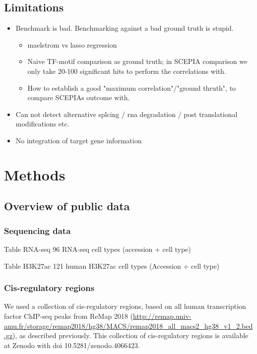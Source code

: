 \subsection{Limitations}
\begin{itemize}
    \item Benchmark is bad. Benchmarking against a bad ground truth is stupid.
    \begin{itemize}
        \item maelstrom vs lasso regression
        \item Naive TF-motif comparison as ground truth; in SCEPIA comparison we only take 20-100 significant hits to perform the correlations with.
        \item How to establish a good "maximum correlation"/"ground thruth", to compare SCEPIAs outcome with.
    \end{itemize}
    \item Can not detect alternative splcing / rna degradation / post translational modifications etc.
    \item No integration of target gene information

\end{itemize}

\section{Methods}

\subsection{Overview of public data}

\subsubsection{Sequencing data}

Table RNA-seq
96  RNA-seq cell types (accession + cell type)
 
Table H3K27ac
121 human H3K27ac cell types (Accession + cell type)

\subsubsection{Cis-regulatory regions}

We used a collection of cis-regulatory regions, based on all human transcription factor ChIP-seq peaks from ReMap 2018\cite{Chneby2017} (\url{http://remap.univ-amu.fr/storage/remap2018/hg38/MACS/remap2018_all_macs2_hg38_v1_2.bed.gz}), as described previously\cite{Xu_2020}. This collection of cis-regulatory regions is available at Zenodo with doi 10.5281/zenodo.4066423.

